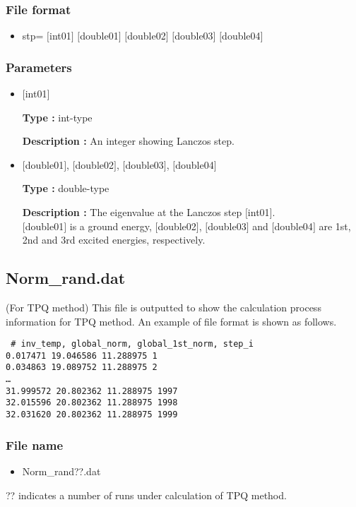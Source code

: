 \subsubsection{File format}
 \begin{itemize}
   \item stp= $[$int01$]$ $[$double01$]$ $[$double02$]$ $[$double03$]$ $[$double04$]$
  \end{itemize}
\subsubsection{Parameters}
 \begin{itemize}

  \item  $[$int01$]$
  
 {\bf Type :} int-type

{\bf Description :} An integer showing Lanczos step.
 
  \item  $[$double01$]$, $[$double02$]$, $[$double03$]$, $[$double04$]$

 {\bf Type :} double-type 

{\bf Description :} The eigenvalue at the Lanczos step $[$int01$]$.\\
$[$double01$]$ is a ground energy, $[$double02$]$, $[$double03$]$ and $[$double04$]$ are 1st, 2nd and 3rd excited energies, respectively.

 \end{itemize}

\newpage
\subsection{Norm\_rand.dat}
\label{Subsec:normrand}
(For TPQ method) This file is outputted to show the calculation process information for TPQ method.
An example of file format is shown as follows.\\
\begin{minipage}{12.5cm}
\begin{screen}
\begin{verbatim}
 # inv_temp, global_norm, global_1st_norm, step_i 
0.017471 19.046586 11.288975 1
0.034863 19.089752 11.288975 2
…
31.999572 20.802362 11.288975 1997
32.015596 20.802362 11.288975 1998
32.031620 20.802362 11.288975 1999
\end{verbatim}
\end{screen}
\end{minipage}

\subsubsection{File name}
 \begin{itemize}
   \item Norm\_rand??.dat
  \end{itemize}
  ?? indicates a number of runs under calculation of TPQ method.

